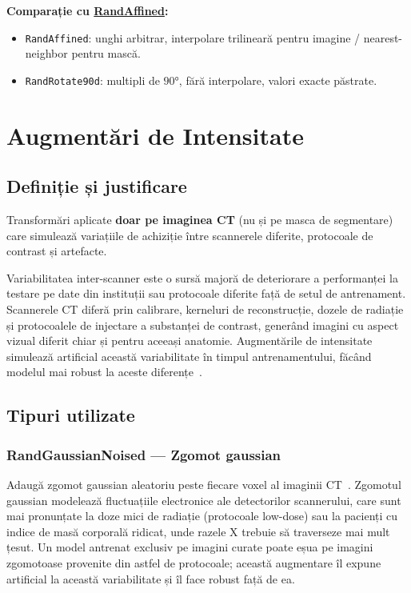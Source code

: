 \documentclass[12pt, a4paper]{report}
\begin{document}
\textbf{Comparație cu \hyperref[sec:randaffine]{RandAffined}:}
\begin{itemize}
    \item \texttt{RandAffined}: unghi arbitrar, interpolare
          trilineară pentru imagine / nearest-neighbor pentru mască.
    \item \texttt{RandRotate90d}: multipli de $90°$, fără
          interpolare, valori exacte păstrate.
\end{itemize}

\section{Augmentări de Intensitate}
\label{sec:aug_intensitate}

\subsection{Definiție și justificare}

\vspace{4pt}
\begin{infobox}
Transformări aplicate \textbf{doar pe imaginea CT} (nu și pe masca de
segmentare) care simulează variațiile de achiziție între scannerele
diferite, protocoale de contrast și artefacte.
\end{infobox}

Variabilitatea inter-scanner este o sursă majoră de deteriorare a performanței la testare
pe date din instituții sau protocoale diferite față de setul de antrenament.
Scannerele CT diferă prin calibrare, kerneluri de reconstrucție, dozele de radiație
și protocoalele de injectare a substanței de contrast, generând imagini cu aspect vizual
diferit chiar și pentru aceeași anatomie. Augmentările de intensitate simulează artificial
această variabilitate în timpul antrenamentului, făcând modelul mai robust la aceste diferențe~\cite{isensee2019automated}.

\subsection{Tipuri utilizate}

\subsubsection{RandGaussianNoised — Zgomot gaussian}
\label{sec:gaussnoise}

Adaugă zgomot gaussian aleatoriu peste fiecare voxel al imaginii CT~\cite{isensee2019automated}.
Zgomotul gaussian modelează fluctuațiile electronice ale detectorilor scannerului,
care sunt mai pronunțate la doze mici de radiație (protocoale low-dose) sau la pacienți
cu indice de masă corporală ridicat, unde razele X trebuie să traverseze mai mult țesut.
Un model antrenat exclusiv pe imagini curate poate eșua pe imagini zgomotoase provenite
din astfel de protocoale; această augmentare îl expune artificial la această variabilitate
și îl face robust față de ea.
\end{document}
